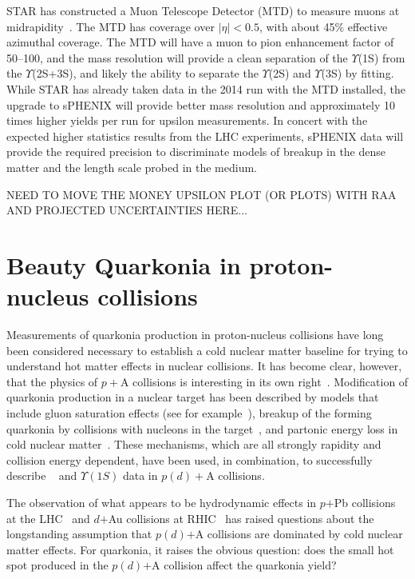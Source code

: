 STAR has constructed a Muon Telescope Detector (MTD) to measure muons
at midrapidity~\cite{Ruan:2009ug}. The MTD 
has coverage over $|\eta| < 0.5$, with about 45\% effective
azimuthal coverage. The MTD will have a muon to pion enhancement
factor of 50--100, and the mass resolution will provide a clean
separation of the $\Upsilon$(1S) from the $\Upsilon$(2S+3S), and
likely the ability to separate the $\Upsilon$(2S) and $\Upsilon$(3S)
by fitting. While STAR has already taken data in the 2014 run with the MTD
installed, the upgrade to sPHENIX will provide better mass
resolution and approximately 10 times higher yields per run for
upsilon measurements.   In concert with the expected higher statistics results 
from the LHC experiments, sPHENIX data will provide the required precision to
discriminate models of breakup in the dense matter and the length scale
probed in the medium.

NEED TO MOVE THE MONEY UPSILON PLOT (OR PLOTS) WITH RAA AND PROJECTED UNCERTAINTIES HERE...

\section{Beauty Quarkonia in proton-nucleus collisions}
\label{sec:pA_quarkonia}

Measurements of quarkonia production in proton-nucleus collisions have
long been considered necessary to establish a cold nuclear matter
baseline for trying to understand hot matter effects in nuclear
collisions. It has become clear, however, that the physics of $p+$A
collisions is interesting in its own
right~\cite{Brambilla:2010cs}. Modification of quarkonia production in
a nuclear target has been described by models that include gluon
saturation effects (see for example~\cite{Eskola:2009uj}), breakup of
the forming quarkonia by collisions with nucleons in the
target~\cite{Arleo:1999af,McGlinchey:2012bp}, and partonic energy loss
in cold nuclear matter~\cite{Arleo:2012rs}.  These mechanisms, which
are all strongly rapidity and collision energy dependent, have been
used, in combination, to successfully describe \jpsi~ and
$\Upsilon(1S)$ data in $p(d)+$A collisions.

The observation of what appears to be hydrodynamic effects in $p$$+$Pb
collisions at the
LHC~\cite{Abelev:2012ola,Aad:2013fja,Chatrchyan:2013nka} and $d$$+$Au
collisions at RHIC~\cite{Adare:2013piz} has raised questions about the
longstanding assumption that $p(d)$$+$A collisions are dominated by cold
nuclear matter effects. For quarkonia, it raises the obvious question:
does the small hot spot produced in the $p(d)$$+$A collision affect the
quarkonia yield?


